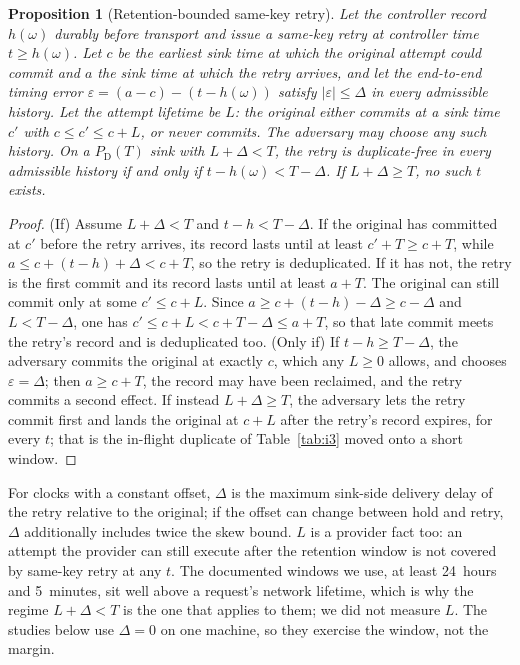 \documentclass[conference,10pt]{IEEEtran}
\newtheorem{proposition}{Proposition}
\newcommand{\PDT}{P_{\mathrm{D}}(T)}
\begin{document}
\begin{proposition}[Retention-bounded same-key retry]\label{prop:retention}
Let the controller record $h(\omega)$ durably before transport and issue a same-key retry at controller time $t\ge h(\omega)$. Let $c$ be the earliest sink time at which the original attempt could commit and $a$ the sink time at which the retry arrives, and let the \emph{end-to-end timing error} $\varepsilon=(a-c)-(t-h(\omega))$ satisfy $|\varepsilon|\le\Delta$ in every admissible history. Let the attempt \emph{lifetime} be $L$: the original either commits at a sink time $c'$ with $c\le c'\le c+L$, or never commits. The adversary may choose any such history. On a $\PDT$ sink with $L+\Delta<T$, the retry is duplicate-free in every admissible history if and only if $t-h(\omega)<T-\Delta$. If $L+\Delta\ge T$, no such $t$ exists.
\end{proposition}
\begin{proof}
(If) Assume $L+\Delta<T$ and $t-h<T-\Delta$. If the original has committed at $c'$ before the retry arrives, its record lasts until at least $c'+T\ge c+T$, while $a\le c+(t-h)+\Delta<c+T$, so the retry is deduplicated. If it has not, the retry is the first commit and its record lasts until at least $a+T$. The original can still commit only at some $c'\le c+L$. Since $a\ge c+(t-h)-\Delta\ge c-\Delta$ and $L<T-\Delta$, one has $c'\le c+L<c+T-\Delta\le a+T$, so that late commit meets the retry's record and is deduplicated too. (Only if) If $t-h\ge T-\Delta$, the adversary commits the original at exactly $c$, which any $L\ge 0$ allows, and chooses $\varepsilon=\Delta$; then $a\ge c+T$, the record may have been reclaimed, and the retry commits a second effect. If instead $L+\Delta\ge T$, the adversary lets the retry commit first and lands the original at $c+L$ after the retry's record expires, for every $t$; that is the in-flight duplicate of Table~\ref{tab:i3} moved onto a short window.
\end{proof}
For clocks with a constant offset, $\Delta$ is the maximum sink-side delivery delay of the retry relative to the original; if the offset can change between hold and retry, $\Delta$ additionally includes twice the skew bound. $L$ is a provider fact too: an attempt the provider can still execute after the retention window is not covered by same-key retry at any $t$. The documented windows we use, at least 24~hours and 5~minutes, sit well above a request's network lifetime, which is why the regime $L+\Delta<T$ is the one that applies to them; we did not measure $L$. The studies below use $\Delta=0$ on one machine, so they exercise the window, not the margin.
\end{document}
